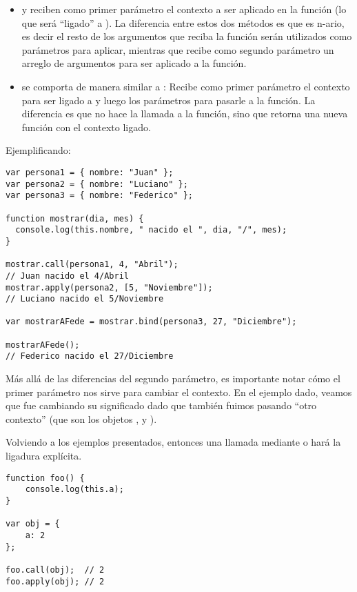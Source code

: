 \begin{itemize}
\item {} y  reciben como primer parámetro el contexto a ser aplicado en la función (lo que será "`ligado"' a ). La diferencia entre estos dos métodos es que  es n-ario, es decir el resto de los argumentos que reciba la función serán utilizados como parámetros para aplicar, mientras que  recibe como segundo parámetro un arreglo de argumentos para ser aplicado a la función.
\item {} se comporta de manera similar a : Recibe como primer parámetro el contexto para ser ligado a  y luego los parámetros para pasarle a la función. La diferencia es que  no hace la llamada a la función, sino que retorna una nueva función con el contexto ligado.
\end{itemize}

Ejemplificando:

\begin{lstlisting}[title={\code{call}, \code{apply} y \code{bind} en acción}]
var persona1 = { nombre: "Juan" };
var persona2 = { nombre: "Luciano" };
var persona3 = { nombre: "Federico" };

function mostrar(dia, mes) {
  console.log(this.nombre, " nacido el ", dia, "/", mes);
}

mostrar.call(persona1, 4, "Abril");
// Juan nacido el 4/Abril
mostrar.apply(persona2, [5, "Noviembre"]);
// Luciano nacido el 5/Noviembre

var mostrarAFede = mostrar.bind(persona3, 27, "Diciembre");

mostrarAFede();
// Federico nacido el 27/Diciembre
\end{lstlisting}

Más allá de las diferencias del segundo parámetro, es importante notar cómo el primer parámetro nos sirve para cambiar el contexto. En el ejemplo dado, veamos que  fue cambiando su significado dado que también fuimos pasando "`otro contexto"' (que son los objetos ,  y ).

Volviendo a los ejemplos presentados, entonces una llamada mediante  o  hará la ligadura explícita.

\begin{lstlisting}[title={Ligadura explícita}]
function foo() {
	console.log(this.a);
}

var obj = {
	a: 2
};

foo.call(obj); 	// 2
foo.apply(obj);	// 2
\end{lstlisting}

